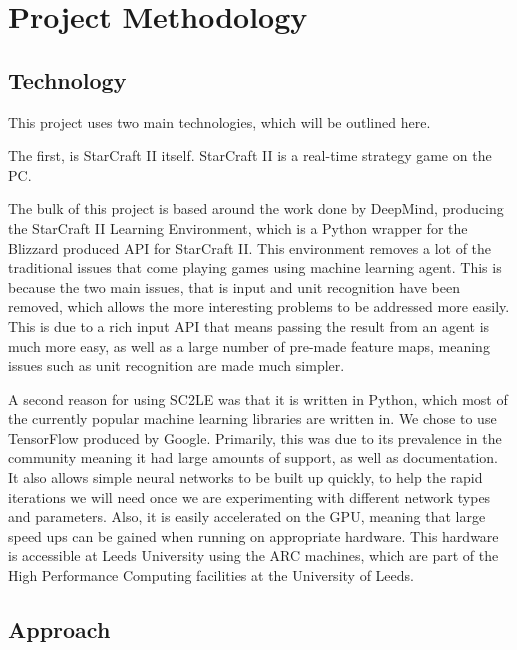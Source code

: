 \chapter{Project Methodology}%
\label{method}

\section{Technology}

This project uses two main technologies, which will be outlined here.

The first, is StarCraft II itself. StarCraft II is a real-time strategy game on
the PC\@.


The bulk of this project is based around the work done by DeepMind, producing
the StarCraft II Learning Environment, which is a Python\cite{python-website}
wrapper for the Blizzard produced API for StarCraft II\cite{bliz-api}. This
environment removes a lot of the traditional issues that come playing
games using machine learning agent. This is because the two main issues, that
is input and unit recognition have been removed, which allows the more interesting
problems to be addressed more easily. This is due to a rich input API that means
passing the result from an agent is much more easy, as well as a large number
of pre-made feature maps, meaning issues such as unit recognition are made much
simpler.

A second reason for using SC2LE was that it is written in Python, which most
of the currently popular machine learning libraries are written in. We chose to
use TensorFlow\cite{abadi2016tensorflow} produced by Google. Primarily,
this was due to its prevalence in the community meaning it had large amounts of
support, as well as documentation. It also allows simple neural networks to be
built up quickly, to help the rapid iterations we will need once we are experimenting
with different network types and parameters. Also, it is easily accelerated on the
GPU, meaning that large speed ups can be gained when running on appropriate hardware.
This hardware is accessible at Leeds University using the ARC machines, which are
part of the High Performance Computing facilities at the University
of Leeds\cite{arc}.

\section{Approach}

